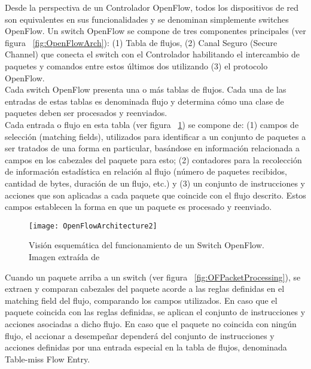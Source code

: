 Desde la perspectiva de un Controlador OpenFlow, todos los dispositivos de red son equivalentes en sus funcionalidades y se denominan simplemente switches OpenFlow. Un switch OpenFlow se compone de tres componentes principales (ver figura ~\ref{fig:OpenFlowArch}): (1) Tabla de flujos, (2) Canal Seguro 
 (Secure Channel) que conecta el switch con el Controlador habilitando el intercambio de paquetes y comandos entre estos últimos dos utilizando (3) el protocolo OpenFlow.\\
 
Cada switch OpenFlow presenta una o m\'as tablas de flujos. Cada una de las entradas de estas tablas es denominada flujo y determina c\'omo una clase de paquetes deben ser procesados y reenviados.\\

Cada entrada o flujo en esta tabla (ver figura ~\ref{fig:OpenFlowArch2}) se compone de: (1) campos de selección (matching fields), utilizados para identificar a un conjunto de paquetes a ser tratados de una forma en particular, basándose en información relacionada a campos en los cabezales del paquete para esto; (2) contadores para la recolección de información estadística en relación al flujo (n\'umero de paquetes recibidos, cantidad de bytes, duración de un flujo, etc.) y (3) un conjunto de instrucciones y acciones que son aplicadas a cada paquete que coincide con el flujo descrito. Estos campos establecen la forma en que un paquete es procesado y reenviado.
 
\begin{figure}[htbp!] 
\centering    
\texttt{[image: OpenFlowArchitecture2]}
\caption[Visión esquemática del funcionamiento de un Switch OpenFlow]{Visión esquemática del funcionamiento de un Switch OpenFlow. Imagen extraída de \cite{mckeown2008openflow}}
\label{fig:OpenFlowArch2}
\end{figure}

Cuando un paquete arriba a un switch (ver figura ~\ref{fig:OFPacketProcessing}), se extraen y comparan cabezales del paquete acorde a las reglas definidas en el matching field del flujo, comparando los campos utilizados. En caso que el paquete coincida con las reglas definidas, se aplican el conjunto de instrucciones y acciones asociadas a dicho flujo. En caso que el paquete no coincida con ningún flujo, el accionar a desempeñar dependerá del conjunto de instrucciones y acciones definidas por una entrada especial en la tabla de flujos, denominada Table-miss Flow Entry.\\ 

